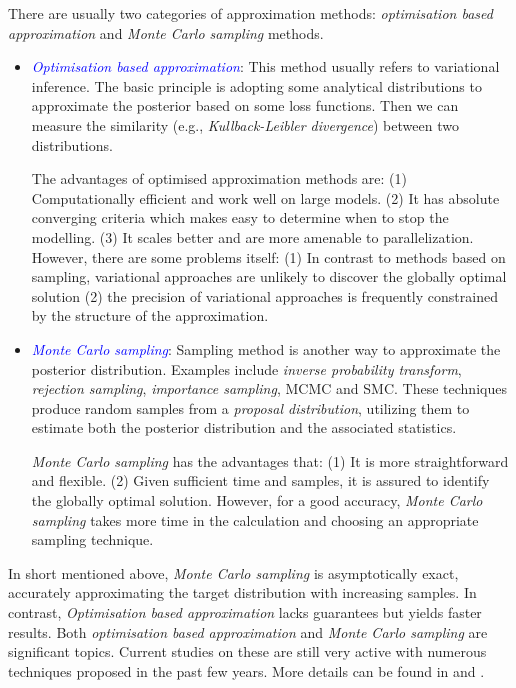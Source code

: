 There are usually two categories of approximation methods: \textit{optimisation based approximation} and \textit{Monte Carlo sampling} methods.
\begin{itemize}[left=0pt]
    \item \textcolor{blue}{\textit{Optimisation based approximation}}: This method usually refers to variational inference. The basic principle is adopting some analytical distributions to approximate the posterior based on some loss functions. Then we can measure the similarity (e.g., \textit{Kullback-Leibler divergence}) between two distributions.

The advantages of optimised approximation methods are: (1) Computationally efficient and work well on large models. (2) It has absolute converging criteria which makes easy to determine when to stop the modelling. (3) It scales better and are more amenable to parallelization. However, there are some problems itself: (1) In contrast to methods based on sampling, variational approaches are unlikely to discover the globally optimal solution (2) the precision of variational approaches is frequently constrained by the structure of the approximation.
    \item \textcolor{blue}{\textit{Monte Carlo sampling}}: Sampling method is another way to approximate the posterior distribution. Examples include \textit{inverse probability transform}, \textit{rejection sampling}, \textit{importance sampling}, \acrfull{MCMC} and \acrfull{SMC}. These techniques produce random samples from a \textit{proposal distribution}, utilizing them to estimate both the posterior distribution and the associated statistics.

  \textit{Monte Carlo sampling} has the advantages that: (1) It is more straightforward and flexible. (2) Given sufficient time and samples, it is assured to identify the globally optimal solution. However, for a good accuracy, \textit{Monte Carlo sampling} takes more time in the calculation and choosing an appropriate sampling technique. 
\end{itemize}

In short mentioned above, \textit{Monte Carlo sampling} is asymptotically exact, accurately approximating the target distribution with increasing samples. In contrast, \textit{Optimisation based approximation} lacks guarantees but yields faster results. Both \textit{optimisation based approximation} and \textit{Monte Carlo sampling} are significant topics. Current studies on these are still very active with numerous techniques proposed in the past few years. More details can be found in \cite{murphy2012} and \cite{blei2017}.

